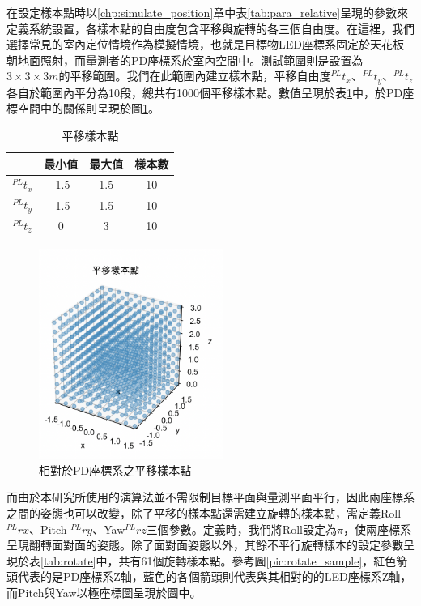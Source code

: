 在設定樣本點時以\ref{chp:simulate_position}章中表\ref{tab:para_relative}呈現的參數來定義系統設置，各樣本點的自由度包含平移與旋轉的各三個自由度。在這裡，我們選擇常見的室內定位情境作為模擬情境，也就是目標物LED座標系固定於天花板朝地面照射，而量測者的PD座標系於室內空間中。測試範圍則是設置為$3 \times 3 \times 3 m$的平移範圍。我們在此範圍內建立樣本點，平移自由度$^{PL}t_x$、$^{PL}t_y$、$^{PL}t_z$各自於範圍內平分為10段，總共有1000個平移樣本點。數值呈現於表\ref{tab:translate}中，於PD座標空間中的關係則呈現於圖\ref{pic:translate_sample}。

\begin{table}[htpb]
    \begin{center}
      \caption{平移樣本點}
      \label{tab:translate}
      \begin{tabular}{c|c|c|c} %
         & \textbf{最小值} & \textbf{最大值}&\textbf{樣本數}\\
        \hline
        $^{PL}t_x$ & -1.5 & 1.5&10\\
        $^{PL}t_y$ & -1.5 & 1.5&10\\
        $^{PL}t_z$ & 0 & 3 &10\\
      \end{tabular}
    \end{center}
  \end{table}

\begin{figure}[htpb]
    \centering
    \includegraphics[width=6cm]{ch4pic/translate_sample.png}
    \caption{相對於PD座標系之平移樣本點}
    \label{pic:translate_sample}
\end{figure}

而由於本研究所使用的演算法並不需限制目標平面與量測平面平行，因此兩座標系之間的姿態也可以改變，除了平移的樣本點還需建立旋轉的樣本點，需定義Roll $^{PL}rx$、Pitch $^{PL}ry$、Yaw$^{PL}rz$三個參數。定義時，我們將Roll設定為$\pi$，使兩座標系呈現翻轉面對面的姿態。除了面對面姿態以外，其餘不平行旋轉樣本的設定參數呈現於表\ref{tab:rotate}中，共有61個旋轉樣本點。參考圖\ref{pic:rotate_sample}，紅色箭頭代表的是PD座標系Z軸，藍色的各個箭頭則代表與其相對的的LED座標系Z軸，而Pitch與Yaw以極座標圖呈現於圖中。



